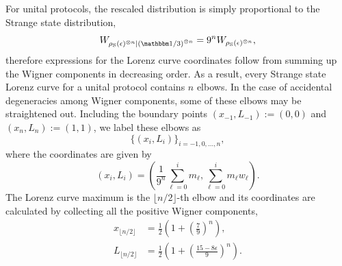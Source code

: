 \documentclass[pra,
aps,
twocolumn,
superscriptaddress,
groupedaddress,
nofootinbib,
reprint
]{revtex4-1}
\begin{document}
For unital protocols, the rescaled distribution is simply proportional to the Strange state distribution,
\begin{equation}
	W_{\rho_{\rm{S}}(\epsilon)^{\otimes n}|\left(\id/3\right)^{\otimes n}} = 9^n W_{\rho_{\rm{S}}(\epsilon)^{\otimes n}},
\end{equation}
therefore expressions for the Lorenz curve coordinates follow from summing up the Wigner components in decreasing order.
As a result, every Strange state Lorenz curve for a unital protocol contains $n$ elbows. In the case of accidental degeneracies among Wigner components, some of these elbows may be straightened out.
Including the boundary points $(x_{-1}, L_{-1}) := (0,0)$ and $(x_{n}, L_{n}) := (1,1)$, we label these elbows as 
\begin{equation*}
\{(x_{i}, L_{i})\}_{i=-1,0,\dots,n},
\end{equation*}
where the coordinates are given by
\begin{equation}
	(x_{i}, L_{i}) = \left( \frac{1}{9^n}\sum_{\ell=0}^i m_{\ell}, \sum_{\ell=0}^i m_{\ell} w_{\ell} \right).
\end{equation}
The Lorenz curve maximum is the $\lfloor n/2 \rfloor$-th elbow and its coordinates are calculated by collecting all the positive Wigner components,
\begin{align}
	x_{\lfloor n/2 \rfloor} &= \frac{1}{2}\left(1 + \left(\frac{7}{9}\right)^n\right), \\
	L_{\lfloor n/2 \rfloor} &= \frac{1}{2}\left (1 + \left(\frac{15 - 8\epsilon}{9}\right)^n \right).
\end{align}
\end{document}
